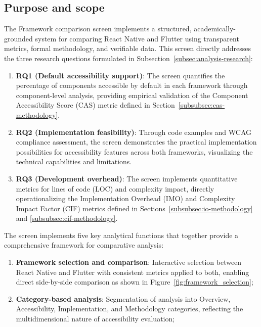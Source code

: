 {\FloatBarrier

\subsection{Purpose and scope}
\label{subsec:framework-comparison-purpose}

The Framework comparison screen implements a structured, academically-grounded system for comparing React Native and Flutter using transparent metrics, formal methodology, and verifiable data. This screen directly addresses the three research questions formulated in Subsection~\ref{subsec:analysis-research}:

\begin{enumerate}
    \item \textbf{RQ1 (Default accessibility support)}: The screen quantifies the percentage of components accessible by default in each framework through component-level analysis, providing empirical validation of the Component Accessibility Score (CAS) metric defined in Section~\ref{subsubsec:cas-methodology}.
    
    \item \textbf{RQ2 (Implementation feasibility)}: Through code examples and WCAG compliance assessment, the screen demonstrates the practical implementation possibilities for accessibility features across both frameworks, visualizing the technical capabilities and limitations.
    
    \item \textbf{RQ3 (Development overhead)}: The screen implements quantitative metrics for lines of code (LOC) and complexity impact, directly operationalizing the Implementation Overhead (IMO) and Complexity Impact Factor (CIF) metrics defined in Sections~\ref{subsubsec:io-methodology} and \ref{subsubsec:cif-methodology}.
\end{enumerate}

The screen implements five key analytical functions that together provide a comprehensive framework for comparative analysis:

\begin{enumerate}
    \item \textbf{Framework selection and comparison}: Interactive selection between React Native and Flutter with consistent metrics applied to both, enabling direct side-by-side comparison as shown in Figure~\ref{fig:framework_selection};
    
    \item \textbf{Category-based analysis}: Segmentation of analysis into Overview, Accessibility, Implementation, and Methodology categories, reflecting the multidimensional nature of accessibility evaluation;
    

\end{enumerate}}
